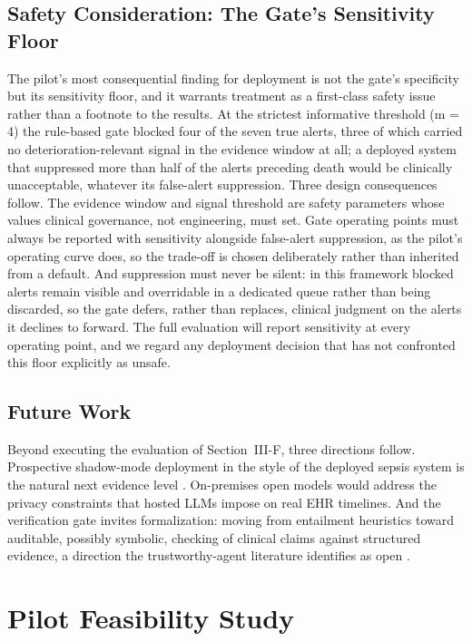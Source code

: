 \subsection{Safety Consideration: The Gate's Sensitivity Floor}

The pilot's most consequential finding for deployment is not the gate's specificity but its
sensitivity floor, and it warrants treatment as a first-class safety issue rather than a
footnote to the results. At the strictest informative threshold (m = 4) the rule-based gate
blocked four of the seven true alerts, three of which carried no deterioration-relevant
signal in the evidence window at all; a deployed system that suppressed more than half of
the alerts preceding death would be clinically unacceptable, whatever its false-alert
suppression. Three
design consequences follow. The evidence window and signal threshold are safety parameters
whose values clinical governance, not engineering, must set. Gate operating points must
always be reported with sensitivity alongside false-alert suppression, as the pilot's
operating curve does, so the trade-off is chosen deliberately rather than inherited from a
default. And suppression must never be silent: in this framework blocked alerts remain
visible and overridable in a dedicated queue rather than being discarded, so the gate
defers, rather than replaces, clinical judgment on the alerts it declines to forward. The
full evaluation will report sensitivity at every operating point, and we regard any
deployment decision that has not confronted this floor explicitly as unsafe.

\subsection{Future Work}

Beyond executing the evaluation of Section~III-F, three directions follow. Prospective
shadow-mode deployment in the style of the deployed sepsis system is the natural next
evidence level \cite{shashikumar2025sepsis}. On-premises open models \cite{toma2023clinicalcamel}
would address the privacy constraints that hosted LLMs impose on real EHR timelines. And the
verification gate invites formalization: moving from entailment heuristics toward auditable,
possibly symbolic, checking of clinical claims against structured evidence, a direction the
trustworthy-agent literature identifies as open \cite{yu2025trustagent,tan2026undcs}.


\section{Pilot Feasibility Study}

